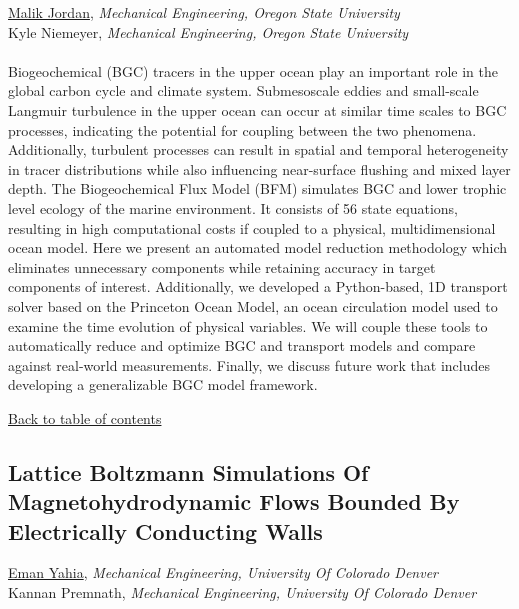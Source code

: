\underline{Malik Jordan}, \textit{Mechanical Engineering, Oregon State University}\\ 
{Kyle Niemeyer}, \textit{Mechanical Engineering, Oregon State University}\\ 
\vspace{-0.1 in} \\ 
\noindent Biogeochemical (BGC) tracers in the upper ocean play an important role in the global carbon cycle and climate system. Submesoscale eddies and small-scale Langmuir turbulence in the upper ocean can occur at similar time scales to BGC processes, indicating the potential for coupling between the two phenomena. Additionally, turbulent processes can result in spatial and temporal heterogeneity in tracer distributions while also influencing near-surface flushing and mixed layer depth. The Biogeochemical Flux Model (BFM) simulates BGC and lower trophic level ecology of the marine environment. It consists of 56 state equations, resulting in high computational costs if coupled to a physical, multidimensional ocean model. Here we present an automated model reduction methodology which eliminates unnecessary components while retaining accuracy in target components of interest. Additionally, we developed a Python-based, 1D transport solver based on the Princeton Ocean Model, an ocean circulation model used to examine the time evolution of physical variables. We will couple these tools to automatically reduce and optimize BGC and transport models and compare against real-world measurements. Finally, we discuss future work that includes developing a generalizable BGC model framework. \\ 
\begin{flushright}\vspace{-0.2 in}\hyperlink{toc}{Back to table of contents}\end{flushright}\vspace{-0.2 in}
\hypertarget{EmanYahia}{\subsection*{\color{CUGOLD} Lattice Boltzmann Simulations Of Magnetohydrodynamic Flows Bounded By Electrically Conducting Walls}} \vsp 
\underline{Eman Yahia}, \textit{Mechanical Engineering, University Of Colorado Denver}\\ 
{Kannan Premnath}, \textit{Mechanical Engineering, University Of Colorado Denver}\\ 
\vspace{-0.1 in} \\ 
